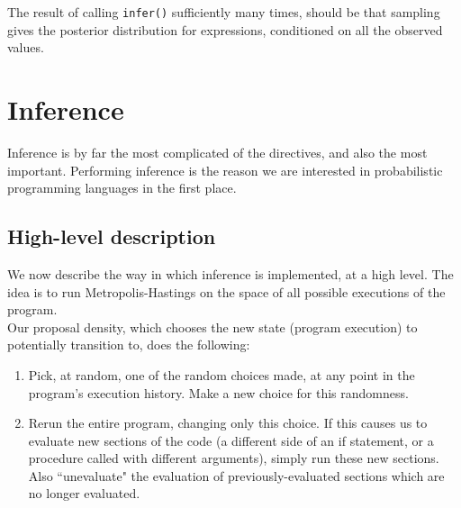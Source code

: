 \documentclass[11pt]{article}
\begin{document}
The result of calling {\tt infer()} sufficiently many times, should be that sampling gives the posterior distribution for expressions, conditioned on all the observed values.  

\section{Inference}

Inference is by far the most complicated of the directives, and also the most important.  Performing inference is the reason we are interested in probabilistic programming languages in the first place.  




%



\subsection{High-level description}

We now describe the way in which inference is implemented, at a high level.   The idea is to run Metropolis-Hastings on the space of all possible executions of the program.  \\

Our proposal density, which chooses the new state (program execution) to potentially transition to, does the following:   
\begin{enumerate}
\item Pick, at random, one of the random choices made, at any point in the program's execution history.  Make a new choice for this randomness.  
\item Rerun the entire program, changing only this choice.  If this causes us to evaluate new sections of the code (a different side of an if statement, or a procedure called with different arguments), simply run these new sections.  
Also ``unevaluate" the evaluation of previously-evaluated sections which are no longer evaluated.   
\end{enumerate}
\end{document}
